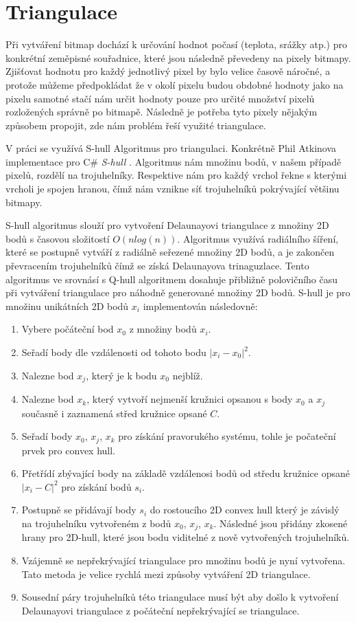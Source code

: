 \documentclass[czech,bachelor,dept460,male,csharp,cpdeclaration]{diploma}
\begin{document}
	\section{Triangulace}
	
	Při vytváření bitmap dochází k určování hodnot počasí (teplota, srážky atp.) pro konkrétní zeměpisné souřadnice, které jsou následně převedeny na pixely bitmapy. Zjišťovat hodnotu pro každý jednotlivý pixel by bylo velice časově náročné, a protože můžeme předpokládat že v okolí pixelu budou obdobné hodnoty jako na pixelu samotné stačí nám určit hodnoty pouze pro určité množství pixelů rozložených správně po bitmapě. Následně je potřeba tyto pixely nějakým způsobem propojit, zde nám problém řeší využité triangulace.
	
	V práci se využívá S-hull Algoritmus pro triangulaci. Konkrétně Phil Atkinova implementace pro C\# \emph{S-hull} \cite{shull}. Algoritmus nám množinu bodů, v našem případě pixelů, rozdělí na trojuhelníky. Respektive nám pro každý vrchol řekne s kterými vrcholi je spojen hranou, čímž nám vznikne síť trojuhelníků pokrývající většinu bitmapy.
	
	
	S-hull algoritmus slouží pro vytvoření Delaunayovi triangulace z množiny 2D bodů s časovou složitostí $O(n  log(n))$. Algoritmus využívá radiálního šíření, které se postupně vytváří z radiálně seřezené množiny 2D bodů, a je zakončen převracením trojuhelníků čímž se získá Delaunayova trinaguzlace. Tento algoritmus ve srovnásí s Q-hull algoritmem dosahuje přibližně polovičního času při vytváření triangulace pro náhodně generované množiny 2D bodů. S-hull je pro množinu unikátních 2D bodů $x_i$ implementován následovně:
	\begin{enumerate}
		\item Vybere počáteční bod $x_0$ z množiny bodů $x_i$.
		\item Seřadí body dle vzdálenosti od tohoto bodu $|x_i - x_0|^2$.
		\item Nalezne bod $x_j$, který je k bodu $x_0$ nejblíž.
		\item Nalezne bod $x_k$, který vytvoří nejmenší kružnici opsanou s body $x_0$ a $x_j$ současně i zaznamená střed kružnice opsané $C$.
		\item Seřadí body $x_0$, $x_j$, $x_k$ pro získání pravorukého systému, tohle je počateční prvek pro convex hull.
		\item Přetřídí zbývající body na základě vzdálenosi bodů od středu kružnice opsané $|x_i - C|^2$ pro získání bodů $s_i$.
		\item Postupně se přidávají body $s_i$ do rostoucího 2D convex hull který je závislý na trojuhelníku vytvořeném z bodů $x_0$, $x_j$, $x_k$. Následné jsou přidány zkosené hrany pro 2D-hull, které jsou bodu viditelné z nově vytvořených trojuhelníků.
		\item Vzájemně se nepřekrývající triangulace pro množinu bodů je nyní vytvořena. Tato metoda je velice rychlá mezi způsoby vytváření 2D triangulace.
		\item Sousední páry trojuhelníků této triangulace musí být  aby došlo k vytvoření Delaunayovi triangulace z počáteční nepřekrývající se triangulace.
	\end{enumerate}
\end{document}
